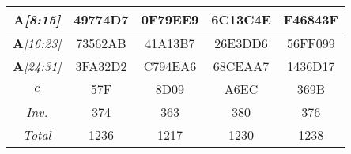 \begin{sidewaystable}
\begin{center}
\begin{tabular}{|c||c|c|c|c|}
\emph{$\mathbf{A}$[8:15]} & 49774D7 &  0F79EE9 &  6C13C4E &  F46843F \\ \hline
\emph{$\mathbf{A}$[16:23]} & 73562AB &  41A13B7 &  26E3DD6 &  56FF099 \\ \hline
\emph{$\mathbf{A}$[24:31]} & 3FA32D2 &  C794EA6 &  68CEAA7 &  1436D17 \\ \hline
\emph{$c$} & 57F &  8D09 &  A6EC &  369B \\ \hline
\emph{Inv.} & 374 &  363 &  380 &  376 \\ \hline
\emph{Total} & 1236 &   1217 &  1230 &   1238 \\ \hline
    \end{tabular}
\end{center}
\end{sidewaystable}

